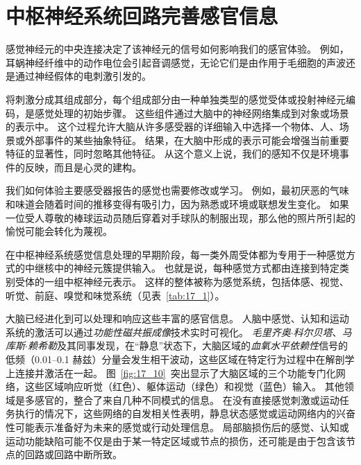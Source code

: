 \section{中枢神经系统回路完善感官信息}

感觉神经元的中央连接决定了该神经元的信号如何影响我们的感官体验。 
例如，耳蜗神经纤维中的动作电位会引起音调感觉，无论它们是由作用于毛细胞的声波还是通过神经假体的电刺激引发的。


将刺激分成其组成部分，每个组成部分由一种单独类型的感觉受体或投射神经元编码，是感觉处理的初始步骤。 
这些组件通过大脑中的神经网络集成到对象或场景的表示中。 
这个过程允许大脑从许多感受器的详细输入中选择一个物体、人、场景或外部事件的某些抽象特征。 
结果，在大脑中形成的表示可能会增强当前重要特征的显著性，同时忽略其他特征。 
从这个意义上说，我们的感知不仅是环境事件的反映，而且是心灵的建构。


我们如何体验主要感受器报告的感觉也需要修改或学习。 
例如，最初厌恶的气味和味道会随着时间的推移变得有吸引力，因为熟悉或环境或联想发生变化。 
如果一位受人尊敬的棒球运动员随后穿着对手球队的制服出现，那么他的照片所引起的愉悦可能会转化为蔑视。


在中枢神经系统感觉信息处理的早期阶段，每一类外周受体都为专用于一种感觉方式的中继核中的神经元簇提供输入。 
也就是说，每种感觉方式都由连接到特定类别受体的一组中枢神经元表示。 
这样的整体被称为感觉系统，包括体感、视觉、听觉、前庭、嗅觉和味觉系统（见表~\ref{tab:17_1}）。


大脑已经进化到可以处理和响应这些丰富的感官信息。 
人脑中感觉、认知和运动系统的激活可以通过\textit{功能性磁共振成像}技术实时可视化。 
\textit{毛里齐奥$\cdot$科尔贝塔}、\textit{马库斯$\cdot$赖希勒}及其同事发现，在“静息”状态下，大脑区域的\textit{血氧水平依赖性}信号的低频（0.01–0.1 赫兹）分量会发生相干波动，这些区域在特定行为过程中在解剖学上连接并激活在一起。
图~\ref{fig:17_10}~突出显示了大脑区域的三个功能专门化网络，这些区域响应听觉（红色）、躯体运动（绿色）和视觉（蓝色）输入。 
其他领域是多感官的，整合了来自几种不同模式的信息。 
在没有直接感觉刺激或运动任务执行的情况下，这些网络的自发相关性表明，静息状态感觉或运动网络内的兴奋性可能表示准备好为未来的感觉或行动处理信息。 
局部脑损伤后的感觉、认知或运动功能缺陷可能不仅是由于某一特定区域或节点的损伤，还可能是由于包含该节点的回路或回路中断所致。


